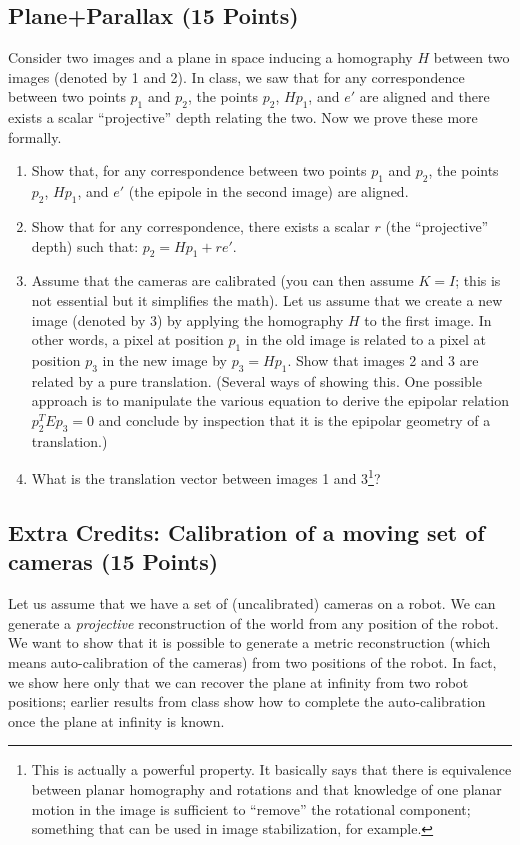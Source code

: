 \documentclass[11pt]{article}
\begin{document}
\subsection{Plane+Parallax (15 Points)}

Consider two images and a plane in space inducing a homography $H$ between  two images (denoted by 1 and 2). In class, we saw that for any correspondence between two points $p_1$ and $p_2$, the points $p_2$, $Hp_1$, and $e'$ are aligned and there exists a scalar ``projective'' depth relating the two. Now we prove these more formally.
\begin{enumerate}

\item Show that, for any correspondence between two points $p_1$ and $p_2$, the points $p_2$, $Hp_1$, and $e'$ (the epipole in the second image) are aligned.

\item Show that for any correspondence, there exists a scalar $r$ (the ``projective'' depth) such that: $p_2 = Hp_1 + re'$.

\item Assume that the cameras are calibrated (you can then assume $K=I$; this is not essential but it simplifies the math). Let us assume that we create a new image (denoted by 3) by applying the homography $H$ to the first image. In other words, 
a pixel at position $p_1$ in the old image is related to a pixel at position $p_3$ in the new image by $p_3 = Hp_1$. Show that images 2 and 3
are related by a pure translation. (Several ways of showing this. One possible approach is to manipulate the various equation to derive the
epipolar relation $p_2^TEp_3 = 0$ and conclude by inspection that it is the epipolar geometry of a translation.)

\item What is the translation vector between images 1 and 3\footnote{This is actually a powerful property. It basically says that there is equivalence between planar homography and rotations and that knowledge of one planar motion in the image is sufficient to ``remove'' the rotational component; something that can be used in image stabilization, for example.}? 
\end{enumerate} 

\subsection{Extra Credits: Calibration of a moving set of cameras (15 Points)}
Let us assume that we have a set of (uncalibrated) cameras on a robot. We can generate a {\em projective} 
reconstruction of the world from any position of the robot. We want to show that it is possible to generate a metric
reconstruction (which means auto-calibration of the cameras) from two positions of the robot. In fact, we show here only that
we can recover the plane at infinity from two robot positions; earlier results from class show how to complete the 
auto-calibration once the plane at infinity is known.\\
\end{document}
